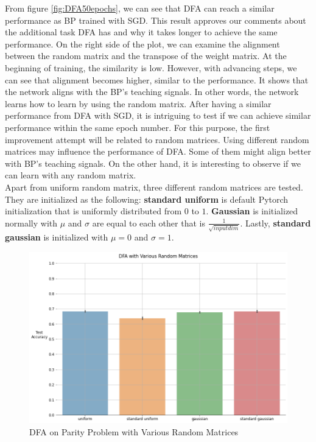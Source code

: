 \documentclass[a4paper, nobind]{templates/ociamthesis}
\begin{document}
\noindent From figure \ref{fig:DFA50epochs}, we can see that DFA can reach a similar performance as BP trained with SGD. This result approves our comments about the additional task DFA has and why it takes longer to achieve the same performance. On the right side of the plot, we can examine the alignment between the random matrix and the transpose of the weight matrix. At the beginning of training, the similarity is low. However, with advancing steps, we can see that alignment becomes higher, similar to the performance. It shows that the network aligns with the BP's teaching signals. In other words, the network learns how to learn by using the random matrix.
\noindent After having a similar performance from DFA with SGD, it is intriguing to test if we can achieve similar performance within the same epoch number. For this purpose, the first improvement attempt will be related to random matrices. Using different random matrices may influence the performance of DFA. Some of them might align better with BP's teaching signals. On the other hand, it is interesting to observe if we can learn with any random matrix.\\
Apart from uniform random matrix, three different random matrices are tested. They are initialized as the following: \textbf{standard uniform} is default Pytorch initialization that is uniformly distributed from \(0\) to \(1\). \textbf{Gaussian} is initialized normally with \(\mu\) and \(\sigma\) are equal to each other that is \(\frac{1}{\sqrt{input dim}}\). Lastly, \textbf{standard gaussian} is initialized with \(\mu=0\) and \(\sigma=1\).

\begin{figure}

{\centering \includegraphics[width=1\linewidth]{figures/3_k3_DFA_RandomMatrices} 

}

\caption{DFA on Parity Problem with Various Random Matrices}\label{fig:DFARandomMatrices}
\end{figure}
\end{document}
